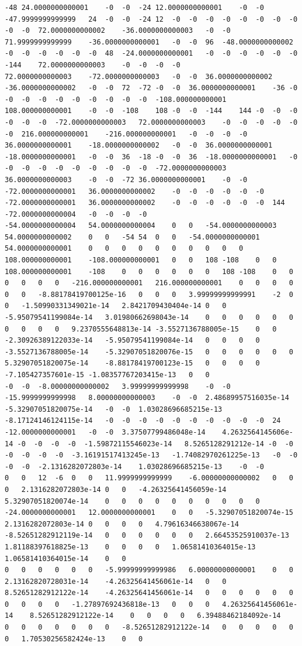\documentclass[12pt]{report} %
\begin{document}
\begin{landscape}
\begin{lstlisting}[numbers=none, basicstyle=\ttfamily\tiny, captionpos=b, caption={Matriz de coeficientes $W = G^{-1}$ ($54\times54$) calculada con MATLAB, sin redondear.}, label=cod:W-matlab]
-48	24.0000000000001	-0	-0	-24	12.0000000000001	-0	-0	-47.9999999999999	24	-0	-0	-24	12	-0	-0	-0	-0	-0	-0	-0	-0	-0	-0	72.0000000000002	-36.0000000000003	-0	-0	71.9999999999999	-36.0000000000001	-0	-0	96	-48.0000000000002	-0	-0	-0	-0	-0	-0	48	-24.0000000000001	-0	-0	-0	-0	-0	-0	-144	72.0000000000003	-0	-0	-0	-0
72.0000000000003	-72.0000000000003	-0	-0	36.0000000000002	-36.0000000000002	-0	-0	72	-72	-0	-0	36.0000000000001	-36	-0	-0	-0	-0	-0	-0	-0	-0	-0	-0	-108.000000000001	108.000000000001	-0	-0	-108	108	-0	-0	-144	144	-0	-0	-0	-0	-0	-0	-72.0000000000003	72.0000000000003	-0	-0	-0	-0	-0	-0	216.000000000001	-216.000000000001	-0	-0	-0	-0
36.0000000000001	-18.0000000000002	-0	-0	36.0000000000001	-18.0000000000001	-0	-0	36	-18	-0	-0	36	-18.0000000000001	-0	-0	-0	-0	-0	-0	-0	-0	-0	-0	-72.0000000000003	36.0000000000003	-0	-0	-72	36.0000000000001	-0	-0	-72.0000000000001	36.0000000000002	-0	-0	-0	-0	-0	-0	-72.0000000000001	36.0000000000002	-0	-0	-0	-0	-0	-0	144	-72.0000000000004	-0	-0	-0	-0
-54.0000000000004	54.0000000000004	0	0	-54.0000000000003	54.0000000000002	0	0	-54	54	0	0	-54.0000000000001	54.0000000000001	0	0	0	0	0	0	0	0	0	0	108.000000000001	-108.000000000001	0	0	108	-108	0	0	108.000000000001	-108	0	0	0	0	0	0	108	-108	0	0	0	0	0	0	-216.000000000001	216.000000000001	0	0	0	0
0	0	-8.88178419700125e-16	0	0	0	3.99999999999991	-2	0	0	-1.50990331349021e-14	2.8421709430404e-14	0	0	-5.95079541199084e-14	3.01980662698043e-14	0	0	0	0	0	0	0	0	0	0	9.2370555648813e-14	-3.5527136788005e-15	0	0	-2.30926389122033e-14	-5.95079541199084e-14	0	0	0	0	-3.5527136788005e-14	-5.32907051820076e-15	0	0	0	0	0	0	5.32907051820075e-14	-8.88178419700123e-15	0	0	0	0	-7.105427357601e-15	-1.08357767203415e-13	0	0
-0	-0	-8.00000000000002	3.99999999999998	-0	-0	-15.9999999999998	8.00000000000003	-0	-0	2.48689957516035e-14	-5.32907051820075e-14	-0	-0	1.03028696685215e-13	-8.17124146124115e-14	-0	-0	-0	-0	-0	-0	-0	-0	-0	-0	24	-12.0000000000001	-0	-0	3.37507799486048e-14	4.2632564145606e-14	-0	-0	-0	-0	-1.59872115546023e-14	8.5265128291212e-14	-0	-0	-0	-0	-0	-0	-3.16191517413245e-13	-1.74082970261225e-13	-0	-0	-0	-0	-2.1316282072803e-14	1.03028696685215e-13	-0	-0
0	0	12	-6	0	0	11.9999999999999	-6.00000000000002	0	0	0	2.1316282072803e-14	0	0	-4.26325641456059e-14	5.32907051820074e-14	0	0	0	0	0	0	0	0	0	0	-24.0000000000001	12.0000000000001	0	0	-5.32907051820074e-15	2.1316282072803e-14	0	0	0	0	4.79616346638067e-14	-8.52651282912119e-14	0	0	0	0	0	0	2.66453525910037e-13	1.81188397618825e-13	0	0	0	0	1.06581410364015e-13	1.06581410364015e-14	0	0
0	0	0	0	0	0	-5.99999999999986	6.00000000000001	0	0	2.13162820728031e-14	-4.26325641456061e-14	0	0	8.52651282912122e-14	-4.26325641456061e-14	0	0	0	0	0	0	0	0	0	0	-1.27897692436818e-13	0	0	0	4.26325641456061e-14	8.52651282912122e-14	0	0	0	0	6.39488462184092e-14	0	0	0	0	0	0	0	-8.52651282912122e-14	0	0	0	0	0	0	1.70530256582424e-13	0	0

\end{lstlisting}
\end{landscape}
\end{document}
